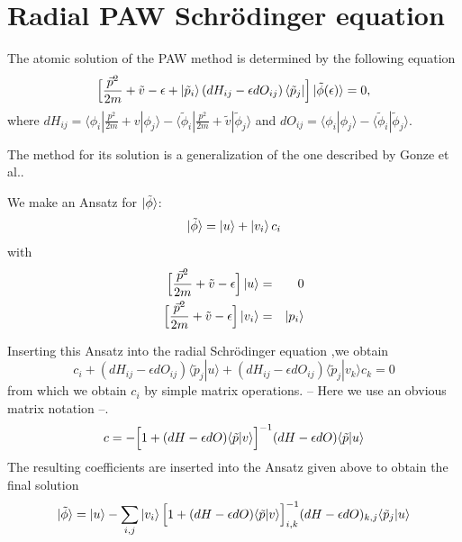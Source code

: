 \documentclass[11pt,a4paper]{report}
\begin{document}
\section{Radial PAW Schr\"odinger equation}
The atomic solution of the PAW method is determined by the following
equation
\begin{equation}
\Bigl\lbrack
\frac{\vec{p}^2}{2m}+\tilde{v}-\epsilon
+\ket{\tilde{p}_i}(dH_{ij} - \epsilon dO_{ij}) \bra{\tilde{p}_j}
\Bigr\rbrack
\ket{\tilde{\phi}(\epsilon)} = 0,
\label{eq:pawradeq}
\end{equation}
where
$dH_{ij}=\langle\phi_i|\frac{p^2}{2m}+ v|\phi_j\rangle
- \langle\tilde{\phi}_i|\frac{p^2}{2m} + \tilde{v}|\tilde{\phi}_j\rangle$
and $dO_{ij}=\langle\phi_i|\phi_j\rangle-
\langle\tilde{\phi}_i|\tilde{\phi}_j\rangle$.

The method for its solution is a generalization of the one described
by Gonze et al.\cite{gonze91_prb44_8503}.

We make an Ansatz for $\ket{\tilde{\phi}}$:
\begin{equation}
\ket{\tilde{\phi}}=\ket{u}+\ket{v_i}c_i
\label{eq:pawradeqansatz}
\end{equation}
with
\begin{eqnarray}
\Bigl\lbrack
\frac{\vec{p}^2}{2m}+\tilde{v}-\epsilon
\Bigr\rbrack \ket{u} &=& 0
\\
\Bigl\lbrack
\frac{\vec{p}^2}{2m}+\tilde{v}-\epsilon
\Bigr\rbrack \ket{v_i}& =& \ket{p_i}
\end{eqnarray}

Inserting this Ansatz  into the radial
Schr\"odinger equation ,we obtain
\begin{equation}
c_i + (dH_{ij} - \epsilon dO_{ij}) \langle\tilde{p}_j|u\rangle
+(dH_{ij} - \epsilon dO_{ij}) \langle\tilde{p}_j|v_k\rangle c_k=0
\end{equation}
from which we obtain $c_i$ by simple matrix operations. -- Here we use
an obvious matrix notation --.
\begin{equation}
c=-\Bigl\lbrack 1+(dH-\epsilon dO)\langle\tilde{p}|v\rangle\Bigr\rbrack^{-1}
(dH-\epsilon dO) \langle\tilde{p}|u\rangle
\end{equation}
The resulting coefficients are inserted into the Ansatz given above to
obtain the final solution
\begin{eqnarray}
\ket{\tilde{\phi}}=\ket{u}-\sum_{i,j}\ket{v_i}
\Bigl\lbrack 1+(dH-\epsilon dO)\langle\tilde{p}|v\rangle\Bigr\rbrack^{-1}_{i,k}
(dH-\epsilon dO)_{k,j} \langle\tilde{p}_j|u\rangle
\end{eqnarray}
\end{document}
